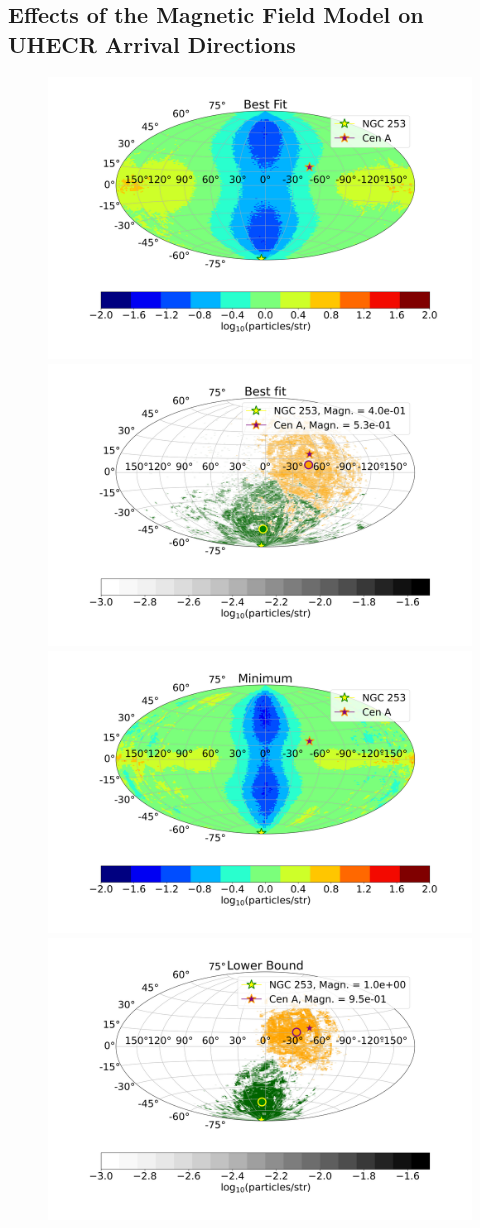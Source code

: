 \documentclass[usenatbib]{mnras}
\begin{document}
\subsection{Effects of the Magnetic Field Model on UHECR Arrival Directions}
\begin{figure}
\centering
\includegraphics[width=0.49\linewidth]{Images/AD_30kpc/Obs_30_Rgc_14kpc_Bstr_3.96_Btur_6.72_R_5_Z_6_New_Grid_Imposed_Log_Bins_180_Historgam_LB_N2_Str_Tur_TM_40_EeV.png}
\includegraphics[width=0.49\linewidth]{Images/AD_30kpc/Rgc_14kpc_BF_Bins_180Bs_3.96_Btur_6.72_N2_CenA_NGC253_Str_Tur_TM_40_EeV.png}\\
\includegraphics[width=0.49\linewidth]{Images/AD_30kpc/Obs_30_Rgc_14kpc_Bstr_2.0_Btur_3.15_R_5_Z_6_New_Grid_Imposed_Log_Bins_180_Historgam_LB_N2_Str_Tur_TM_40_EeV.png}
\includegraphics[width=0.49\linewidth]{Images/AD_30kpc/LB_Bins_180Bs_2.0_Btur_3.15_N2_CenA_NGC253_Str_Tur_TM_40_EeV.png}\\

\end{figure}
\end{document}
